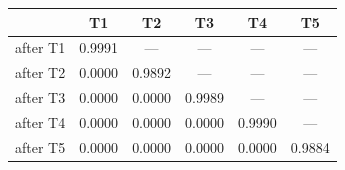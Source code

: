 \begin{tabular}{@{}lccccc@{}}
\toprule
& \textbf{T1} & \textbf{T2} & \textbf{T3} & \textbf{T4} & \textbf{T5} \\
\midrule
after T1 & 0.9991 & --- & --- & --- & --- \\
after T2 & 0.0000 & 0.9892 & --- & --- & --- \\
after T3 & 0.0000 & 0.0000 & 0.9989 & --- & --- \\
after T4 & 0.0000 & 0.0000 & 0.0000 & 0.9990 & --- \\
after T5 & 0.0000 & 0.0000 & 0.0000 & 0.0000 & 0.9884 \\
\bottomrule
\end{tabular}
